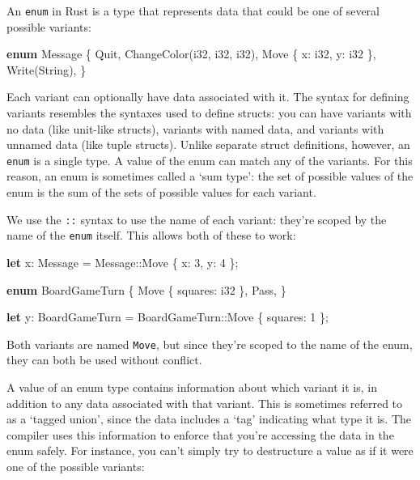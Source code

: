 \documentclass[a4paper,]{book}
\newenvironment{Shaded}{\begin{snugshade}}{\end{snugshade}}
\newcommand{\KeywordTok}[1]{\textcolor[rgb]{0.13,0.29,0.53}{\textbf{{#1}}}}
\newcommand{\DataTypeTok}[1]{\textcolor[rgb]{0.13,0.29,0.53}{{#1}}}
\newcommand{\DecValTok}[1]{\textcolor[rgb]{0.00,0.00,0.81}{{#1}}}
\newcommand{\NormalTok}[1]{{#1}}
\begin{document}
An \texttt{enum} in Rust is a type that represents data that could be
one of several possible variants:

\begin{Shaded}
\begin{Highlighting}[]
\KeywordTok{enum} \NormalTok{Message \{}
    \NormalTok{Quit,}
    \NormalTok{ChangeColor(}\DataTypeTok{i32}\NormalTok{, }\DataTypeTok{i32}\NormalTok{, }\DataTypeTok{i32}\NormalTok{),}
    \NormalTok{Move \{ x: }\DataTypeTok{i32}\NormalTok{, y: }\DataTypeTok{i32} \NormalTok{\},}
    \NormalTok{Write(}\DataTypeTok{String}\NormalTok{),}
\NormalTok{\}}
\end{Highlighting}
\end{Shaded}

Each variant can optionally have data associated with it. The syntax for
defining variants resembles the syntaxes used to define structs: you can
have variants with no data (like unit-like structs), variants with named
data, and variants with unnamed data (like tuple structs). Unlike
separate struct definitions, however, an \texttt{enum} is a single type.
A value of the enum can match any of the variants. For this reason, an
enum is sometimes called a `sum type': the set of possible values of the
enum is the sum of the sets of possible values for each variant.

We use the \texttt{::} syntax to use the name of each variant: they're
scoped by the name of the \texttt{enum} itself. This allows both of
these to work:

\begin{Shaded}
\begin{Highlighting}[]
\KeywordTok{let} \NormalTok{x: Message = Message::Move \{ x: }\DecValTok{3}\NormalTok{, y: }\DecValTok{4} \NormalTok{\};}

\KeywordTok{enum} \NormalTok{BoardGameTurn \{}
    \NormalTok{Move \{ squares: }\DataTypeTok{i32} \NormalTok{\},}
    \NormalTok{Pass,}
\NormalTok{\}}

\KeywordTok{let} \NormalTok{y: BoardGameTurn = BoardGameTurn::Move \{ squares: }\DecValTok{1} \NormalTok{\};}
\end{Highlighting}
\end{Shaded}

Both variants are named \texttt{Move}, but since they're scoped to the
name of the enum, they can both be used without conflict.

A value of an enum type contains information about which variant it is,
in addition to any data associated with that variant. This is sometimes
referred to as a `tagged union', since the data includes a `tag'
indicating what type it is. The compiler uses this information to
enforce that you're accessing the data in the enum safely. For instance,
you can't simply try to destructure a value as if it were one of the
possible variants:
\end{document}
